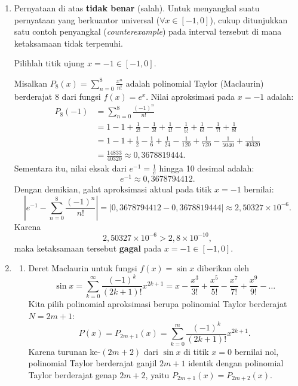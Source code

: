 \documentclass[a4paper]{article}
\begin{document}
\begin{enumerate}
  \item Pernyataan di atas \textbf{tidak benar} (salah). Untuk menyangkal suatu pernyataan yang berkuantor universal ($\forall x \in [-1, 0]$), cukup ditunjukkan satu contoh penyangkal (\textit{counterexample}) pada interval tersebut di mana ketaksamaan tidak terpenuhi.

        Pilihlah titik ujung $x = -1 \in [-1, 0]$.

        Misalkan $P_8(x) = \sum_{n=0}^8 \frac{x^n}{n!}$ adalah polinomial Taylor (Maclaurin) berderajat $8$ dari fungsi $f(x) = e^x$. Nilai aproksimasi pada $x = -1$ adalah:
        \begin{align*}
          P_8(-1) & = \sum_{n=0}^8 \frac{(-1)^n}{n!}                                                                                      \\
                  & = 1 - 1 + \frac{1}{2!} - \frac{1}{3!} + \frac{1}{4!} - \frac{1}{5!} + \frac{1}{6!} - \frac{1}{7!} + \frac{1}{8!}      \\
                  & = 1 - 1 + \frac{1}{2} - \frac{1}{6} + \frac{1}{24} - \frac{1}{120} + \frac{1}{720} - \frac{1}{5040} + \frac{1}{40320} \\
                  & = \frac{14833}{40320} \approx 0{,}3678819444.
        \end{align*}
        Sementara itu, nilai eksak dari $e^{-1} = \frac{1}{e}$ hingga 10 desimal adalah:
        \[
          e^{-1} \approx 0,3678794412.
        \]
        Dengan demikian, galat aproksimasi aktual pada titik $x = -1$ bernilai:
        \[
          \left| e^{-1} - \sum_{n=0}^8 \frac{(-1)^n}{n!} \right| = |0,3678794412 - 0,3678819444| \approx 2,50327 \times 10^{-6}.
        \]
        Karena
        \[
          2,50327 \times 10^{-6} > 2,8 \times 10^{-10},
        \]
        maka ketaksamaan tersebut \textbf{gagal} pada $x = -1 \in [-1, 0]$.

  \item \begin{enumerate}[label=(\alph*)]
          \item Deret Maclaurin untuk fungsi $f(x) = \sin x$ diberikan oleh
                \[
                  \sin x = \sum_{k=0}^\infty \frac{(-1)^k}{(2k+1)!} x^{2k+1} = x - \frac{x^3}{3!} + \frac{x^5}{5!} - \frac{x^7}{7!} + \frac{x^9}{9!} - \dots
                \]
                Kita pilih polinomial aproksimasi berupa polinomial Taylor berderajat $N = 2m+1$:
                \[
                  P(x) = P_{2m+1}(x) = \sum_{k=0}^m \frac{(-1)^k}{(2k+1)!} x^{2k+1}.
                \]
                Karena turunan ke-$(2m+2)$ dari $\sin x$ di titik $x = 0$ bernilai nol, polinomial Taylor berderajat ganjil $2m+1$ identik dengan polinomial Taylor berderajat genap $2m+2$, yaitu $P_{2m+1}(x) = P_{2m+2}(x)$.


\end{enumerate}
\end{enumerate}
\end{document}
